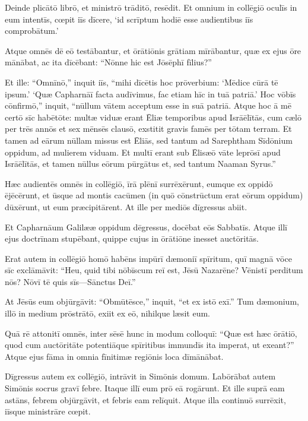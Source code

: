 \Versus Deinde plicātō librō, et ministrō trāditō, resēdit. Et omnium in collēgiō oculīs in eum intentīs,
\Versus cœpit iīs dīcere, `id scrīptum hodiē esse audientibus iīs comprobātum.'

\Versus Atque omnēs dē eō testābantur, et ōrātiōnis grātiam mīrābantur, quæ ex ejus ōre mānābat, ac ita dīcēbant: ``Nōnne hic est Jōsēphī fīlius?''

\Versus Et ille: ``Omnīnō,'' inquit iīs, ``mihi dīcētis hoc prōverbium: `Mēdice cūrā tē ipsum.' `Quæ Capharnāī facta audīvimus, fac etiam hīc in tuā patriā.'
\Versus Hoc vōbīs cōnfirmō,'' inquit, ``nūllum vātem acceptum esse in suā patriā.
\Versus Atque hoc ā mē certō sīc habētōte: multæ viduæ erant Ēliæ temporibus apud Isrāēlītās, cum cælō per trēs annōs et sex mēnsēs clausō, exstitit gravis famēs per tōtam terram.
\Versus Et tamen ad eārum nūllam missus est Ēliās, sed tantum ad Sarephtham Sīdōnium oppidum, ad mulierem viduam.
\Versus Et multī erant sub Ēlisæō vāte leprōsī apud Isrāēlītās, et tamen nūllus eōrum pūrgātus et, sed tantum Naaman Syrus.''

\Versus Hæc audientēs omnēs in collēgiō, īrā plēnī surrēxērunt,
\Versus eumque ex oppidō ējēcērunt, et ūsque ad montis cacūmen (in quō cōnstrūctum erat eōrum oppidum) dūxērunt, ut eum præcipitārent.
\Versus At ille per mediōs dīgressus abiit.

\Versus Et Capharnāum Galilææ oppidum dēgressus, docēbat eōs Sabbatīs.
\Versus Atque illī ejus doctrīnam stupēbant, quippe cujus in ōrātiōne inesset auctōritās.

\Versus Erat autem in collēgiō homō habēns impūrī dæmoniī spīritum, quī magnā vōce sīc exclāmāvit:
\Versus ``Heu, quid tibi nōbīscum reī est, Jēsū Nazarēne? Vēnistī perditum nōs? Nōvī tē quis sīs—Sānctus Deī.''

\Versus At Jēsūs eum objūrgāvit: ``Obmūtēsce,'' inquit, ``et ex istō exī.'' Tum dæmonium, illō in medium prōstrātō, exiit ex eō, nihilque læsit eum.

\Versus Quā rē attonitī omnēs, inter sēsē hunc in modum colloquī: ``Quæ est hæc ōrātiō, quod cum auctōritāte potentiāque spīritibus immundīs ita imperat, ut exeant?''
\Versus Atque ejus fāma in omnia fīnitimæ regiōnis loca dīmānābat.

\Versus Dīgressus autem ex collēgiō, intrāvit in Simōnis domum. Labōrābat autem Simōnis socrus gravī febre. Itaque illī eum prō eā rogārunt.
\Versus Et ille suprā eam astāns, febrem objūrgāvit, et febris eam relīquit. Atque illa continuō surrēxit, iīsque ministrāre cœpit.

